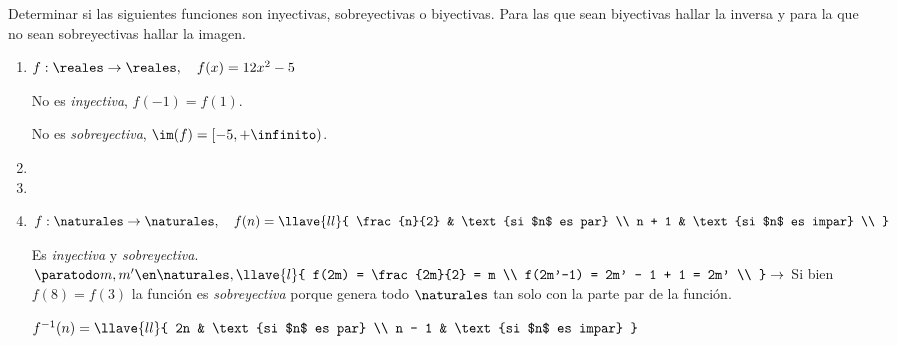 \begin{enunciado}{\ejercicio}
  Determinar si las siguientes funciones son inyectivas, sobreyectivas o biyectivas.
  Para las que sean biyectivas hallar la inversa y para la que no sean sobreyectivas hallar la imagen.
\end{enunciado}

\begin{enumerate}[label=\roman*)]
  \item $f: \reales \to \reales,\quad f(x) = 12 x^2 - 5$\par
        No es \textit{inyectiva}, $f(-1) = f(1)$.\par
        No es \textit{sobreyectiva}, $\im(f) = [-5, +\infinito)$.
  \item \hacer

  \item \hacer

  \item $f: \naturales \to \naturales,\quad
          f(n) = \llave{ll}{
            \frac{n}{2} & \text{si $n$ es par}   \\
            n + 1       & \text{si $n$ es impar} \\
          }$\par

        Es \textit{inyectiva} y \textit{sobreyectiva}. $\paratodo m,m' \en \naturales,
          \llave{l}{
            f(2m) = \frac{2m}{2} = m     \\
            f(2m'-1) = 2m' - 1 + 1 = 2m' \\
          } \to$ Si bien $f(8) = f(3)$ la función es \textit{sobreyectiva} porque
        genera todo $\naturales$ tan solo con la parte par de la función.\par

        $f^{-1}(n) =
          \llave{ll}{
            2n    & \text{si $n$ es par}   \\
            n - 1 & \text{si $n$ es impar}
          }$\par

\end{enumerate}
